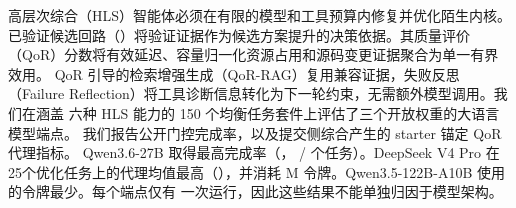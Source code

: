 高层次综合（HLS）智能体必须在有限的模型和工具预算内修复并优化陌生内核。
已验证候选回路（\VCL）将验证证据作为候选方案提升的决策依据。其质量评价
（QoR）分数将有效延迟、容量归一化资源占用和源码变更证据聚合为单一有界效用。
QoR 引导的检索增强生成（QoR-RAG）复用兼容证据，失败反思（Failure
Reflection）将工具诊断信息转化为下一轮约束，无需额外模型调用。我们在涵盖
六种 HLS 能力的 150 个均衡任务套件上评估了三个开放权重的大语言模型端点。
我们报告公开门控完成率，以及提交侧综合产生的 starter 锚定 QoR 代理指标。
Qwen3.6-27B 取得最高完成率（\QwenThreeSixSuccessRate，
\QwenThreeSixSuccessCount{}/\CorpusTaskCount{} 个任务）。DeepSeek V4 Pro
在25个优化任务上的代理均值最高（\DeepSeekQorProxy{}），并消耗
\DeepSeekTokensM{}M 令牌。Qwen3.5-122B-A10B 使用的令牌最少。每个端点仅有
一次运行，因此这些结果不能单独归因于模型架构。
